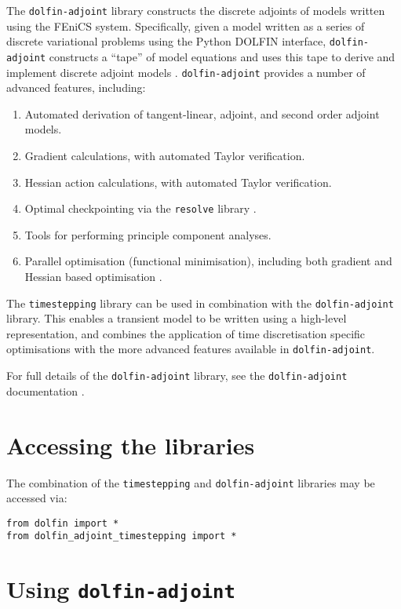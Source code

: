 \documentclass[a4paper]{book}
\begin{document}
The \verb+dolfin-adjoint+ library constructs the discrete adjoints of models
written using the FEniCS system. Specifically, given a model written as a series
of discrete variational problems using the Python DOLFIN interface,
\verb+dolfin-adjoint+ constructs a ``tape'' of model equations and uses this
tape to derive and implement discrete adjoint models \citep{farrell2013}.
\verb+dolfin-adjoint+ provides a number of advanced features, including:
\begin{enumerate}
  \item Automated derivation of tangent-linear, adjoint, and second order
        adjoint models.
  \item Gradient calculations, with automated Taylor verification.
  \item Hessian action calculations, with automated Taylor verification. 
  \item Optimal checkpointing via the \verb+resolve+ library
        \citep{griewank2000}.
  \item Tools for performing principle component analyses.
  \item Parallel optimisation (functional minimisation), including both gradient
        and Hessian based optimisation \citep{funke2013}.
\end{enumerate}

The \verb+timestepping+ library can be used in combination with the \linebreak
\verb+dolfin-adjoint+ library. This enables a transient model to be written
using a high-level representation, and combines the application of time
discretisation specific optimisations with the more advanced features available
in \linebreak \verb+dolfin-adjoint+.

For full details of the \verb+dolfin-adjoint+ library, see the
\verb+dolfin-adjoint+ documentation \citep{da}.

\section{Accessing the libraries}

The combination of the \verb+timestepping+ and \verb+dolfin-adjoint+ libraries
may be accessed via:
\begin{lstlisting}
from dolfin import *
from dolfin_adjoint_timestepping import *
\end{lstlisting}

\section{Using \texttt{dolfin-adjoint}}
\end{document}
